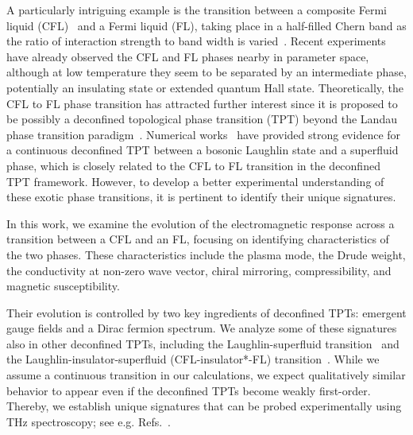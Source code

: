\documentclass[aps,prl,twocolumn,superscriptaddress,floatfix, 10pt,longbibliography, nofootinbib]{revtex4-2}
\begin{document}
A particularly intriguing example is the transition between a composite Fermi liquid (CFL)~\cite{halperin_theory_1993} and a Fermi liquid (FL), taking place in a half-filled Chern band as the ratio of interaction strength to band width is varied~\cite{abouelkomsan_quantum_2023,dong_composite_2023, Goldman_zerofield_2023,abouelkomsan_compressible_2025}. Recent experiments~\cite{park_observation_2023, lu_extended_2025} have already observed the CFL and FL phases nearby in parameter space, although at low temperature they seem to be separated by an intermediate phase, potentially an insulating state or extended quantum Hall state. Theoretically, the CFL to FL phase transition has attracted further interest since it is proposed to be possibly a deconfined topological phase transition (TPT) beyond the Landau phase transition paradigm~\cite{barkeshli_continuous_2012, song_phase_2024}. Numerical works~\cite{barkeshli_continuous_2015,lu_continuous_2025,lotric_paired_2025,wang_emergent_2025}
have provided strong evidence for a continuous deconfined TPT between a bosonic Laughlin state and a superfluid phase, which is closely related to the CFL to FL transition in the deconfined TPT framework. However, to develop a better experimental understanding of these exotic phase transitions, it is pertinent to identify their unique signatures.




In this work, we examine the evolution of the electromagnetic response across a transition between a CFL and an FL, focusing on identifying characteristics of the two phases. These characteristics include the plasma mode, the Drude weight, the conductivity at non-zero wave vector, chiral mirroring, compressibility, and magnetic susceptibility.

Their evolution is controlled by two key ingredients of deconfined TPTs: emergent gauge fields and a Dirac fermion spectrum. We analyze some of these signatures also in other deconfined TPTs, including the Laughlin-superfluid transition~\cite{barkeshli_continuous_2014} and the Laughlin-insulator-superfluid (CFL-insulator*-FL) transition~\cite{barkeshli_continuous_2012,barkeshli_continuous_2014}. While we assume a continuous transition in our calculations, we expect qualitatively similar behavior to appear even if the deconfined TPTs become weakly first-order.
Thereby, we establish unique signatures that can be probed experimentally using
THz spectroscopy; see e.g. Refs.~\cite{xu_electronic_2024,chen_direct_2025, chen_terahertz_2025, pierce_imaging_2025, xu_plasmon_2026}.
\end{document}

